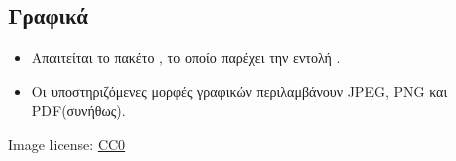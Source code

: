 \documentclass{beamer}
\begin{document}
\subsection{Γραφικά}
\begin{frame}[fragile]{\insertsubsection}
\begin{itemize}
\item Απαιτείται το πακέτο \en {}\gr, το οποίο παρέχει την εντολή \en {}\gr.
\item Οι υποστηριζόμενες μορφές γραφικών περιλαμβάνουν \en JPEG, PNG \gr και \en PDF\gr (συνήθως).
\end{itemize}
\en
{}

\tiny{Image license: \href{https://pixabay.com/en/animal-apple-attractive-beautiful-1239390/}{CC0}}
\end{frame}
\gr
\end{document}
